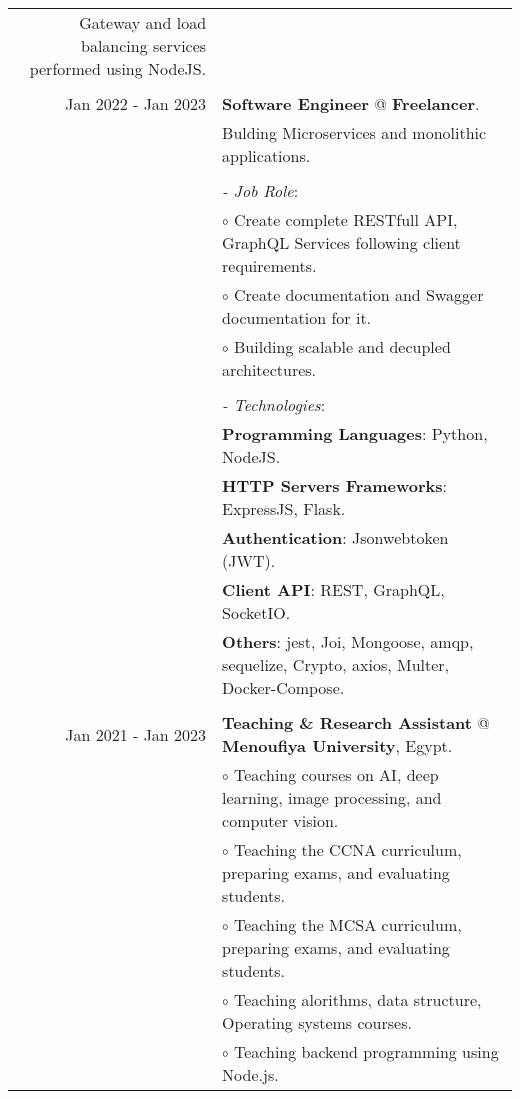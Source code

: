 \documentclass[a4paper,10pt]{article}
\begin{document}
\begin{longtable}{r|l}
    Gateway and load balancing services performed using NodeJS. \\&
    \\
    Jan 2022 - Jan 2023 & \textbf{Software Engineer} @ 
    \textbf{Freelancer}. \\&
    Bulding Microservices and monolithic applications.\\&
    \\&
    \textit{- Job Role}:\\&
    $\circ$ Create complete RESTfull API, GraphQL Services following client requirements. \\ &
    $\circ$ Create documentation and Swagger documentation for it. \\ &
    $\circ$ Building scalable and decupled architectures. \\ &
    \\&
    \textit{- Technologies}:\\&
    \textbf{Programming Languages}: Python, NodeJS.\\ &
    \textbf{HTTP Servers Frameworks}: ExpressJS, Flask.\\&
    \textbf{Authentication}: Jsonwebtoken (JWT).\\&
    \textbf{Client API}: REST, GraphQL, SocketIO.\\&
    \textbf{Others}: jest, Joi, Mongoose, amqp, sequelize, Crypto, axios, Multer, Docker-Compose.\\&  
    \\
    Jan 2021 - Jan 2023 & \textbf{Teaching \& Research Assistant} @ 
    \textbf{Menoufiya University}, Egypt. \\&
    $\circ$ Teaching courses on AI, deep learning, image processing, and computer vision. \\ &
    $\circ$ Teaching the CCNA curriculum, preparing exams, and evaluating students. \\ &
    $\circ$ Teaching the MCSA curriculum, preparing exams, and evaluating students. \\ &
    $\circ$ Teaching alorithms, data structure, Operating systems courses. \\&
    $\circ$ Teaching backend programming using Node.js. 
\end{longtable}
\end{document}
